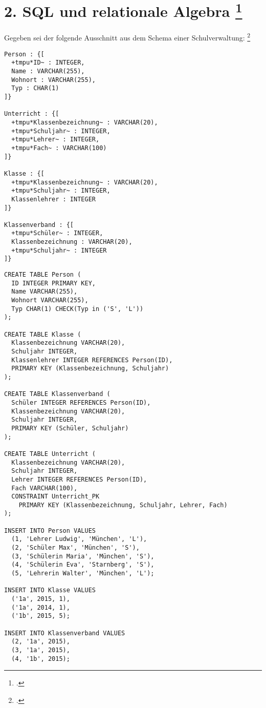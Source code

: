 \documentclass{lehramt-informatik-aufgabe}
\begin{document}

\section{2. SQL und relationale Algebra
\footcite[Thema 2 Teilaufgabe 1 Aufgabe 2]{examen:66116:2016:09}
}

Gegeben sei der folgende Ausschnitt aus dem Schema einer Schulverwaltung:
\footcite{db:ab:examen-gym-2016-09}

\newcommand{\tmpu}[1]{\underline{\texttt{#1}}}

\begin{Verbatim}[commandchars=+*~]
Person : {[
  +tmpu*ID~ : INTEGER,
  Name : VARCHAR(255),
  Wohnort : VARCHAR(255),
  Typ : CHAR(1)
]}

Unterricht : {[
  +tmpu*Klassenbezeichnung~ : VARCHAR(20),
  +tmpu*Schuljahr~ : INTEGER,
  +tmpu*Lehrer~ : INTEGER,
  +tmpu*Fach~ : VARCHAR(100)
]}

Klasse : {[
  +tmpu*Klassenbezeichnung~ : VARCHAR(20),
  +tmpu*Schuljahr~ : INTEGER,
  Klassenlehrer : INTEGER
]}

Klassenverband : {[
  +tmpu*Schüler~ : INTEGER,
  Klassenbezeichnung : VARCHAR(20),
  +tmpu*Schuljahr~ : INTEGER
]}
\end{Verbatim}

\begin{verbatim}
CREATE TABLE Person (
  ID INTEGER PRIMARY KEY,
  Name VARCHAR(255),
  Wohnort VARCHAR(255),
  Typ CHAR(1) CHECK(Typ in ('S', 'L'))
);

CREATE TABLE Klasse (
  Klassenbezeichnung VARCHAR(20),
  Schuljahr INTEGER,
  Klassenlehrer INTEGER REFERENCES Person(ID),
  PRIMARY KEY (Klassenbezeichnung, Schuljahr)
);

CREATE TABLE Klassenverband (
  Schüler INTEGER REFERENCES Person(ID),
  Klassenbezeichnung VARCHAR(20),
  Schuljahr INTEGER,
  PRIMARY KEY (Schüler, Schuljahr)
);

CREATE TABLE Unterricht (
  Klassenbezeichnung VARCHAR(20),
  Schuljahr INTEGER,
  Lehrer INTEGER REFERENCES Person(ID),
  Fach VARCHAR(100),
  CONSTRAINT Unterricht_PK
    PRIMARY KEY (Klassenbezeichnung, Schuljahr, Lehrer, Fach)
);

INSERT INTO Person VALUES
  (1, 'Lehrer Ludwig', 'München', 'L'),
  (2, 'Schüler Max', 'München', 'S'),
  (3, 'Schülerin Maria', 'München', 'S'),
  (4, 'Schülerin Eva', 'Starnberg', 'S'),
  (5, 'Lehrerin Walter', 'München', 'L');

INSERT INTO Klasse VALUES
  ('1a', 2015, 1),
  ('1a', 2014, 1),
  ('1b', 2015, 5);

INSERT INTO Klassenverband VALUES
  (2, '1a', 2015),
  (3, '1a', 2015),
  (4, '1b', 2015);
\end{verbatim}
\end{document}
